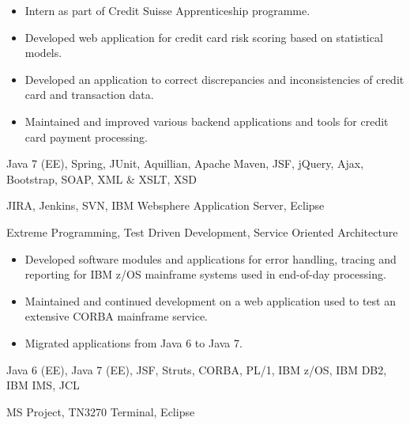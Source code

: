 \medskip
\begin{itemize}
	\item Intern as part of Credit Suisse Apprenticeship programme.
	\item Developed web application for credit card risk scoring based on statistical models.
	\item Developed an application to correct discrepancies and inconsistencies of credit card and transaction data.
	\item Maintained and improved various backend applications and tools for credit card payment processing.
\end{itemize}

\medskip
\begin{description}
	\ifincludestech
	\item [Technologies] Java 7 (EE), Spring, JUnit, Aquillian, Apache Maven, JSF, jQuery, Ajax, Bootstrap, SOAP, XML \& XSLT, XSD
	\fi
	\ifincludestools
	\item [Tools] JIRA, Jenkins, SVN, IBM Websphere Application Server, Eclipse
	\fi
	\ifincludesmethods
	\item [Methodologies] Extreme Programming, Test Driven Development, Service Oriented Architecture
	\fi
\end{description}

\divider


\medskip
\begin{itemize}
	\item Developed software modules and applications for error handling, tracing and reporting for IBM z/OS mainframe systems used in end-of-day processing.
	\item Maintained and continued development on a web application used to test an extensive CORBA mainframe service.
	\item Migrated applications from Java 6 to Java 7.
\end{itemize}

\medskip
\begin{description}
	\ifincludestech
	\item [Technologies] Java 6 (EE), Java 7 (EE), JSF, Struts, CORBA, PL/1, IBM z/OS, IBM DB2, IBM IMS, JCL
	\fi
	\ifincludestools
	\item [Tools] MS Project, TN3270 Terminal, Eclipse
	\fi
\end{description}
